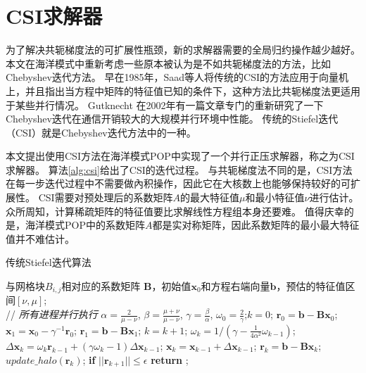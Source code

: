  
\section{CSI求解器}
\label{solver:csi}

为了解决共轭梯度法的可扩展性瓶颈，新的求解器需要的全局归约操作越少越好。 
本文在海洋模式中重新考虑一些原本被认为是不如共轭梯度法的方法，比如Chebyshev迭代方法。
早在1985年，Saad等人\cite{saad1985solving}将传统的CSI的方法应用于向量机上，并且指出当方程中矩阵的特征值已知的条件下，这种方法比共轭梯度法更适用于某些并行情况。  
Gutknecht \cite{gutknecht2002chebyshev} 在2002年有一篇文章专门的重新研究了一下Chebyshev迭代在通信开销较大的大规模并行环境中性能。 
传统的Stiefel迭代（CSI）就是Chebyshev迭代方法中的一种。 


本文提出使用CSI方法在海洋模式POP中实现了一个并行正压求解器，称之为CSI求解器。
算法\ref{alg:csi}给出了CSI的迭代过程。
与共轭梯度法不同的是，CSI方法 在每一步迭代过程中不需要做內积操作，因此它在大核数上也能够保持较好的可扩展性。
CSI需要对预处理后的系数矩阵$A$的最大特征值$\mu$和最小特征值$\nu$进行估计。 
众所周知，计算稀疏矩阵的特征值要比求解线性方程组本身还要难。 
值得庆幸的是，海洋模式POP中的系数矩阵$A$都是实对称矩阵，因此系数矩阵的最小最大特征值并不难估计。 
 
\begin{algorithm}[h]
\caption{传统Stiefel迭代算法}
\label{alg:csi}
\begin{algorithmic}[1]
\REQUIRE 与网格块$B_{i,j}$相对应的系数矩阵 $\textbf{B}$，初始值$\textbf{x}_0$和方程右端向量$\textbf{b}$，预估的特征值区间$[\nu,\mu]$;  \\
 // \qquad    \textit{所有进程并行执行}
\STATE $\alpha =\frac{2}{\mu -\nu}$, $ \beta = \frac{\mu +\nu}{\mu -\nu}$, $\gamma = \frac{\beta}{\alpha}$, $\omega_0 =\frac{ 2}{\gamma}$;\quad $k = 0$;
\STATE $\textbf{r}_0 = \textbf{b}-\textbf{B}\textbf{x}_0$; $\textbf{x}_1 =\textbf{x}_0 -\gamma^{-1}\textbf{r}_0$; $\textbf{r}_1 =\textbf{b} -\textbf{B}\textbf{x}_1$;
\STATE $k=k+1$;
\STATE $\omega_k = 1/(\gamma - \frac{1}{4\alpha^2}\omega_{k-1})$;  \label{AlgCsiIter}
\STATE $\Delta \textbf{x}_{k} =\omega_k\textbf{r}_{k-1}+(\gamma \omega_k-1)\Delta \textbf{x}_{k-1}$; \label{AlgCsiVec1}
\STATE $\textbf{x}_{k} =\textbf{x}_{k-1}+\Delta \textbf{x}_{k-1}$; \label{AlgCsiVec2}
\STATE $\textbf{r}_{k} =\textbf{b}- \textbf{B}\textbf{x}_{k}$;\label{AlgCsiVec3}
\STATE $update\_halo(\textbf{r}_k)$; \label{AlgCsiBound}
\STATE \textbf{if} $||\textbf{r}_{k+1}|| \le \epsilon$  \textbf{return} ;
\ENDIF\ENDWHILE
\end{algorithmic}
\end{algorithm}

